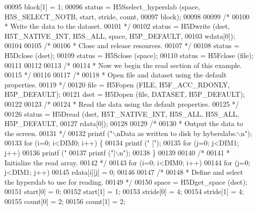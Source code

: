 \begin{DoxyCode}
{00095     block[1] = 1;
00096     status = H5Sselect\_hyperslab (space, H5S\_SELECT\_NOTB, start, stride, count,
00097                 block);
00098 
00099     \textcolor{comment}{/*}
00100 \textcolor{comment}{     * Write the data to the dataset.}
00101 \textcolor{comment}{     */}
00102     status = H5Dwrite (dset, H5T\_NATIVE\_INT, H5S\_ALL, space, H5P\_DEFAULT,
00103                 wdata[0]);
00104 
00105     \textcolor{comment}{/*}
00106 \textcolor{comment}{     * Close and release resources.}
00107 \textcolor{comment}{     */}
00108     status = H5Dclose (dset);
00109     status = H5Sclose (space);
00110     status = H5Fclose (file);
00111 
00112 
00113     \textcolor{comment}{/*}
00114 \textcolor{comment}{     * Now we begin the read section of this example.}
00115 \textcolor{comment}{     */}
00116 
00117     \textcolor{comment}{/*}
00118 \textcolor{comment}{     * Open file and dataset using the default properties.}
00119 \textcolor{comment}{     */}
00120     file = H5Fopen (FILE, H5F\_ACC\_RDONLY, H5P\_DEFAULT);
00121     dset = H5Dopen (file, DATASET, H5P\_DEFAULT);
00122 
00123     \textcolor{comment}{/*}
00124 \textcolor{comment}{     * Read the data using the default properties.}
00125 \textcolor{comment}{     */}
00126     status = H5Dread (dset, H5T\_NATIVE\_INT, H5S\_ALL, H5S\_ALL, H5P\_DEFAULT,
00127                 rdata[0]);
00128 
00129     \textcolor{comment}{/*}
00130 \textcolor{comment}{     * Output the data to the screen.}
00131 \textcolor{comment}{     */}
00132     printf (\textcolor{stringliteral}{"\(\backslash\)nData as written to disk by hyberslabs:\(\backslash\)n"});
00133     \textcolor{keywordflow}{for} (i=0; i<DIM0; i++) \{
00134         printf (\textcolor{stringliteral}{" ["});
00135         \textcolor{keywordflow}{for} (j=0; j<DIM1; j++)
00136             printf (\textcolor{stringliteral}{" %
00137         printf (\textcolor{stringliteral}{"]\(\backslash\)n"});
00138     \}
00139 
00140     \textcolor{comment}{/*}
00141 \textcolor{comment}{     * Initialize the read array.}
00142 \textcolor{comment}{     */}
00143     \textcolor{keywordflow}{for} (i=0; i<DIM0; i++)
00144         \textcolor{keywordflow}{for} (j=0; j<DIM1; j++)
00145             rdata[i][j] = 0;
00146 
00147     \textcolor{comment}{/*}
00148 \textcolor{comment}{     * Define and select the hyperslab to use for reading.}
00149 \textcolor{comment}{     */}
00150     space = H5Dget\_space (dset);
00151     start[0] = 0;
00152     start[1] = 1;
00153     stride[0] = 4;
00154     stride[1] = 4;
00155     count[0] = 2;
00156     count[1] = 2;
}}
\end{DoxyCode}

